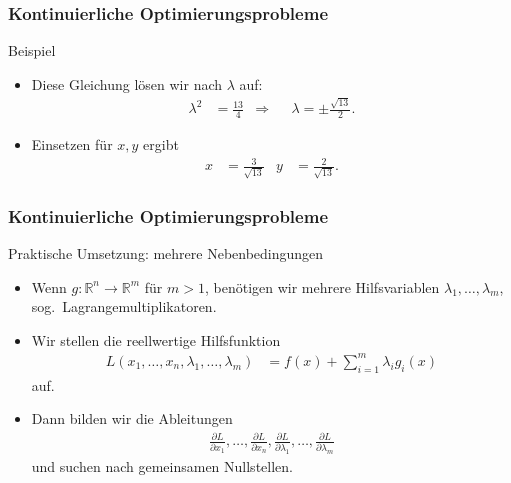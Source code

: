 \documentclass{beamer}
\newcommand\RR{\mathbb R}
\renewcommand{\oe}{\"o}
\newcommand{\ue}{\"u}
\newcommand{\mytitle}{Kontinuierliche Optimierungsprobleme}
\begin{document}
\begin{frame}\frametitle{\mytitle}
	\begin{block}{Beispiel}
	\begin{itemize}
		\item Diese Gleichung l\oe sen wir nach $\lambda$ auf:
			\begin{align*}
				\lambda^2&=\frac{13}{4}&\Rightarrow&&\lambda=\pm\frac{\sqrt{13}}2.
			\end{align*}
		\item Einsetzen f\ue r $x,y$ ergibt
			\begin{align*}
				x&=\frac{3}{\sqrt{13}}&
				y&=\frac{2}{\sqrt{13}}.
			\end{align*}
	\end{itemize}
	\end{block}
\end{frame}

\begin{frame}\frametitle{\mytitle}
	\begin{block}{Praktische Umsetzung: mehrere Nebenbedingungen}
	\begin{itemize}
		\item Wenn $g:\RR^n\to\RR^m$ f\ue r $m>1$, ben\oe tigen wir mehrere Hilfsvariablen $\lambda_1,\ldots,\lambda_m$, sog.\ \alert{Lagrangemultiplikatoren}.
		\item Wir stellen die reellwertige Hilfsfunktion
			\begin{align*}
				L(x_1,\ldots,x_n,\lambda_1,\ldots,\lambda_m)&=f(x)+\sum_{i=1}^m\lambda_ig_i(x)
			\end{align*}
			auf.
		\item Dann bilden wir die Ableitungen
			\begin{align*}
				\frac{\partial L}{\partial x_1},\ldots,\frac{\partial L}{\partial x_n}, 
				\frac{\partial L}{\partial \lambda_1},\ldots,\frac{\partial L}{\partial \lambda_m}
			\end{align*}
			und suchen nach gemeinsamen Nullstellen.
	\end{itemize}
	\end{block}
\end{frame}
\end{document}
